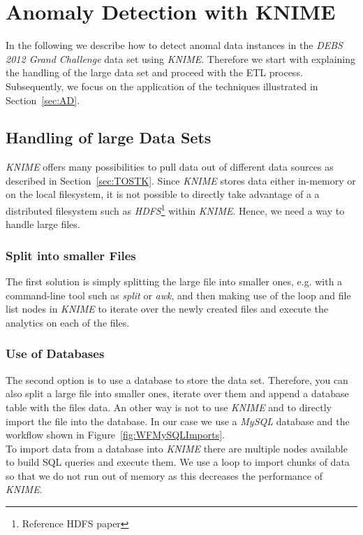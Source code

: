 \documentclass{dima}
\begin{document}
\section{Anomaly Detection with KNIME}
\label{sec:ADwK}

In the following we describe how to detect anomal data instances in the \textit{DEBS 2012 Grand Challenge} data set using \textit{KNIME}. Therefore we start with explaining the handling of the large data set and proceed with the ETL process. Subsequently, we focus on the application of the techniques illustrated in Section~\ref{sec:AD}.

\subsection{Handling of large Data Sets}
\textit{KNIME} offers many possibilities to pull data out of different data sources as described in Section~\ref{sec:TOSTK}. Since \textit{KNIME} stores data either in-memory or on the local filesystem, it is not possible to directly take advantage of a a distributed filesystem such as \textit{HDFS}\footnote{Reference HDFS paper} within \textit{KNIME}. Hence, we need a way to handle large files.

\subsubsection{Split into smaller Files}
The first solution is simply splitting the large file into smaller ones, e.g. with a command-line tool such as \textit{split} or \textit{awk}, and then making use of the loop and file list nodes in \textit{KNIME} to iterate over the newly created files and execute the analytics on each of the files.

\subsubsection{Use of Databases}
The second option is to use a database to store the data set. Therefore, you can also split a large file into smaller ones, iterate over them and append a database table with the files data. An other way is not to use \textit{KNIME} and to directly import the file into the database. In our case we use a \textit{MySQL} database and the workflow shown in Figure~\ref{fig:WFMySQLImports}.\\
To import data from a database into \textit{KNIME} there are multiple nodes available to build SQL queries and execute them. We use a loop to import chunks of data so that we do not run out of memory as this decreases the performance of \textit{KNIME}.
\end{document}
